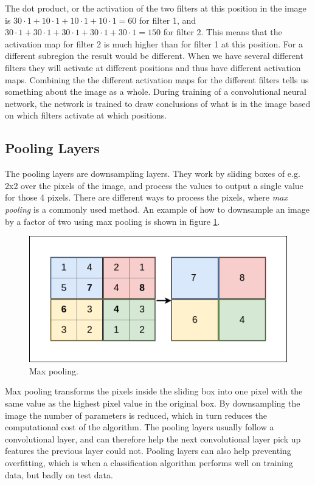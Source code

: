 The dot product, or the activation of the two filters at this position in the image is $30 \cdot 1 + 10 \cdot 1 + 10 \cdot 1 + 10 \cdot 1 = 60$ for filter 1, and $30 \cdot 1 + 30 \cdot 1 + 30 \cdot 1 + 30 \cdot 1 + 30 \cdot 1 = 150$ for filter 2. This means that the activation map for filter 2 is much higher than for filter 1 at this position. For a different subregion the result would be different. When we have several different filters they will activate at different positions and thus have different activation maps. Combining the the different activation maps for the different filters tells us something about the image as a whole. During training of a convolutional neural network, the network is trained to draw conclusions of what is in the image based on which filters activate at which positions. 

\vspace{2mm}


\subsection{Pooling Layers}
The pooling layers are downsampling layers. They work by sliding boxes of e.g. 2x2 over the pixels of the image, and process the values to output a single value for those 4 pixels. There are different ways to process the pixels, where \textit{max pooling} is a commonly used method. An example of how to downsample an image by a factor of two using max pooling is shown in figure \ref{fig:max_pool}.

\begin{figure}[h!]
    \centering
    \includegraphics[scale=0.42]{fig/pooling.png}
    \caption{Max pooling.}
    \label{fig:max_pool}
\end{figure}

Max pooling transforms the pixels inside the sliding box into one pixel with the same value as the highest pixel value in the original box. By downsampling the image the number of parameters is reduced, which in turn reduces the computational cost of the algorithm. The pooling layers usually follow a convolutional layer, and can therefore help the next convolutional layer pick up features the previous layer could not. Pooling layers can also help preventing overfitting, which is when a classification algorithm performs well on training data, but badly on test data.

